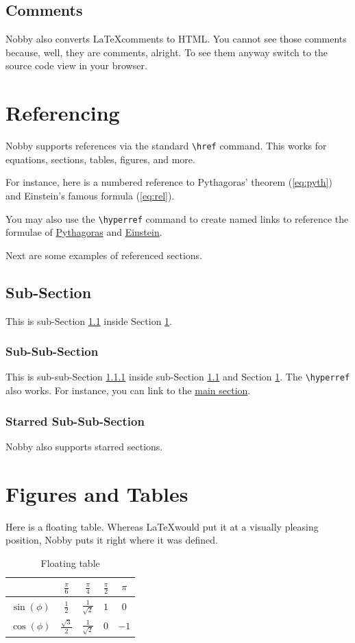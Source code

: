 \documentclass[10pt]{article}
\begin{document}
\subsection{Comments}
Nobby also converts \LaTeX comments to HTML. You cannot see those
comments because, well, they are comments, alright. To see them anyway
switch to the source code view in your browser.

\section{Referencing}
\label{sec:ref}
Nobby supports references via the standard \texttt{\textbackslash{href}}
command. This works for equations, sections, tables, figures, and
more.

For instance, here is a numbered reference to Pythagoras' theorem
(\ref{eq:pyth}) and Einstein's famous formula (\ref{eq:rel}).

You may also use the \texttt{\textbackslash{hyperref}} command to
create named links to reference the formulae of
\hyperref[eq:pyth]{Pythagoras} and \hyperref[eq:rel]{Einstein}.

Next are some examples of referenced sections.

\subsection{Sub-Section}
\label{ss:1}
This is sub-Section \ref{ss:1} inside Section \ref{sec:ref}.

\subsubsection{Sub-Sub-Section}
\label{sss:1}
This is sub-sub-Section \ref{sss:1} inside sub-Section \ref{ss:1} and
Section \ref{sec:ref}. The \texttt{\textbackslash{hyperref}} also
works. For instance, you can link to the \hyperref[sec:ref]{main section}.

\subsubsection*{Starred Sub-Sub-Section}
Nobby also supports starred sections.

\section{Figures and Tables}
Here is a floating table. Whereas  \LaTeX would put it at a visually
pleasing position, Nobby puts it right where it was defined.
\begin{table}
  \centering
  \begin{tabular}{c | c c c c}
    & $\frac{\pi}{6}$& $\frac{\pi}{4}$& $\frac{\pi}{2}$ & $\pi$\\[1mm]
    \hline
    \rule{0cm}{4mm}$\sin(\phi)$& $\frac{1}{2}$ & $\frac{1}{\sqrt{2}}$& $1$ & $0$\\
    \rule{0cm}{4mm}$\cos(\phi)$& $\frac{\sqrt{3}}{2}$ & $\frac{1}{\sqrt{2}}$& $0$&$-1$
  \end{tabular}
  \caption{Floating table}
\end{table}
\end{document}
